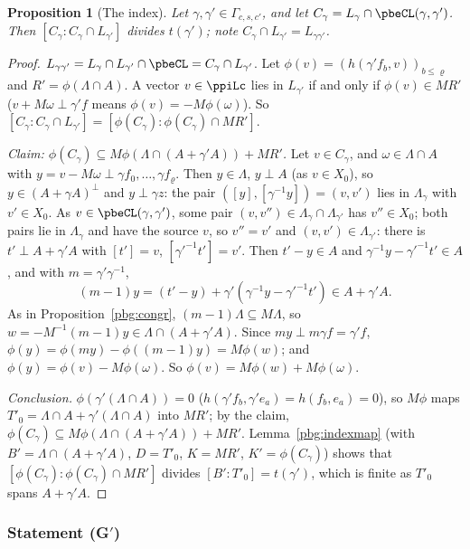 \documentclass[10pt]{amsart}
\newtheorem{proposition}[theorem]{Proposition}
\theoremstyle{definition}
\theoremstyle{remark}
\begin{document}
\begin{proposition}[The index]\label{pbg:index}
Let $\gamma,\gamma'\in\Gamma_{c,s,c'}$, and let $C_\gamma=L_\gamma\cap\pbeCL(\gamma,\gamma')$. Then
$[C_\gamma:C_\gamma\cap L_{\gamma'}]$ divides $t(\gamma')$; note $C_\gamma\cap L_{\gamma'}=L_{\gamma\gamma'}$.
\end{proposition}
\begin{proof}
$L_{\gamma\gamma'}=L_\gamma\cap L_{\gamma'}\cap\pbeCL=C_\gamma\cap L_{\gamma'}$. Let $\phi(v)=(h(\gamma'f_b,v)
)_{b\le\varrho}$ and $R'=\phi(\Lambda\cap A)$. A vector $v\in\ppiLc$ lies in $L_{\gamma'}$ if and only if
$\phi(v)\in MR'$ ($v+M\omega\perp\gamma'f$ means $\phi(v)=-M\phi(\omega)$). So $[C_\gamma:C_\gamma\cap
L_{\gamma'}]=[\phi(C_\gamma):\phi(C_\gamma)\cap MR']$.

\emph{Claim: $\phi(C_\gamma)\subseteq M\phi(\Lambda\cap(A+\gamma'A))+MR'$.} Let $v\in C_\gamma$, and
$\omega\in\Lambda\cap A$ with $y=v-M\omega\perp\gamma f_0,\dots,\gamma f_\varrho$. Then $y\in\Lambda$,
$y\perp A$ (as $v\in X_0$), so $y\in(A+\gamma A)^\perp$ and $y\perp\gamma z$: the pair $([y],[\gamma^{-1}
y])=(v,v')$ lies in $\Lambda_\gamma$ with $v'\in X_0$. As $v\in\pbeCL(\gamma,\gamma')$, some pair $(v,v'')\in
\Lambda_\gamma\cap\Lambda_{\gamma'}$ has $v''\in X_0$; both pairs lie in $\Lambda_\gamma$ and have the
source $v$, so $v''=v'$ and $(v,v')\in\Lambda_{\gamma'}$: there is $t'\perp A+\gamma'A$ with $[t']=v$,
$[\gamma'^{-1}t']=v'$. Then $t'-y\in A$ and $\gamma^{-1}y-\gamma'^{-1}t'\in A$, and with $m=\gamma'\gamma^{-1}$,
\[
(m-1)y=(t'-y)+\gamma'(\gamma^{-1}y-\gamma'^{-1}t')\in A+\gamma'A .
\]
As in Proposition~\ref{pbg:congr}, $(m-1)\Lambda\subseteq M\Lambda$, so $w=-M^{-1}(m-1)y\in\Lambda\cap(A+
\gamma'A)$. Since $my\perp m\gamma f=\gamma'f$, $\phi(y)=\phi(my)-\phi((m-1)y)=M\phi(w)$; and $\phi(y)=
\phi(v)-M\phi(\omega)$. So $\phi(v)=M\phi(w)+M\phi(\omega)$.

\emph{Conclusion.} $\phi(\gamma'(\Lambda\cap A))=0$ ($h(\gamma'f_b,\gamma'e_a)=h(f_b,e_a)=0$), so $M\phi$
maps $T'_0=\Lambda\cap A+\gamma'(\Lambda\cap A)$ into $MR'$; by the claim, $\phi(C_\gamma)\subseteq
M\phi(\Lambda\cap(A+\gamma'A))+MR'$. Lemma~\ref{pbg:indexmap} (with $B'=\Lambda\cap(A+\gamma'A)$,
$D=T'_0$, $K=MR'$, $K'=\phi(C_\gamma)$) shows that $[\phi(C_\gamma):\phi(C_\gamma)\cap MR']$ divides $[B':
T'_0]=t(\gamma')$, which is finite as $T'_0$ spans $A+\gamma'A$.
\end{proof}

\subsubsection{Statement (G$'$)}\label{pbg:ss-main}
\end{document}
